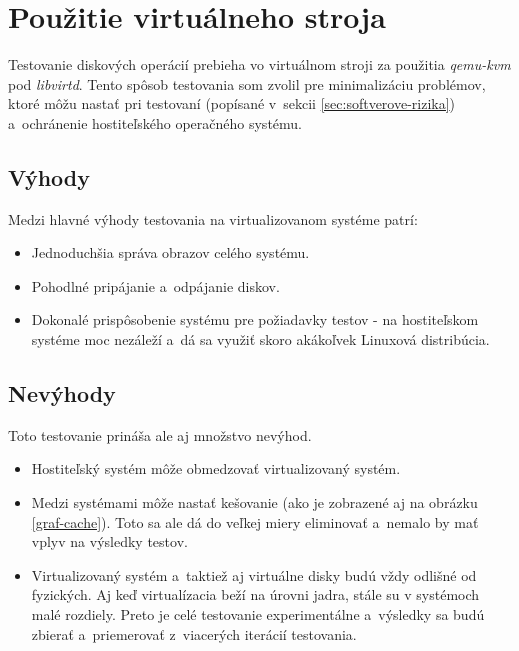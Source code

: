 %
%

\section{Použitie virtuálneho stroja}

Testovanie diskových operácií prebieha vo virtuálnom stroji za použitia
\emph{qemu-kvm} pod \emph{libvirtd}. Tento spôsob testovania som zvolil pre
minimalizáciu problémov, ktoré môžu nastať pri testovaní (popísané v~sekcii
\ref{sec:softverove-rizika}) a~ochránenie hostiteľského operačného systému.

\subsection{Výhody}

Medzi hlavné výhody testovania na virtualizovanom systéme patrí:

\begin{itemize}
    \item Jednoduchšia správa obrazov celého systému.
    \item Pohodlné pripájanie a~odpájanie diskov.
    \item Dokonalé prispôsobenie systému pre požiadavky testov - na
    hostiteľskom systéme moc nezáleží a~dá sa využiť skoro akákoľvek Linuxová
    distribúcia.
\end{itemize}

\subsection{Nevýhody}

Toto testovanie prináša ale aj množstvo nevýhod. 

\begin{itemize}
    \item Hostiteľský systém môže obmedzovať virtualizovaný systém.
    \item Medzi systémami môže nastať kešovanie (ako je zobrazené aj na obrázku
    \ref{graf-cache}). Toto sa ale dá do veľkej miery eliminovať a~nemalo by
    mať vplyv na výsledky testov.
    \item Virtualizovaný systém a~taktiež aj virtuálne disky budú vždy odlišné
    od fyzických. Aj keď virtualízacia beží na úrovni jadra, stále su v
    systémoch malé rozdiely. Preto je celé testovanie experimentálne a~výsledky
    sa budú zbierať a~priemerovať z~viacerých iterácií testovania.
\end{itemize}

